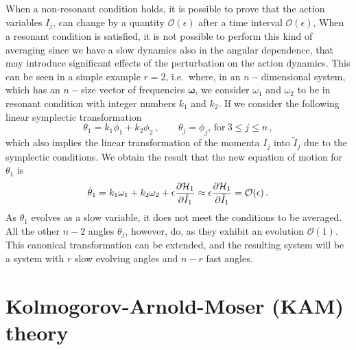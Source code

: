 When a non-resonant condition holds, it is possible to prove that the action variables $I_j$, can change by a quantity $\mathcal{O}(\epsilon)$ after a time interval $\mathcal{O}(\epsilon)$,  
When a resonant condition is satisfied, it is not possible to perform this kind of averaging since we have a slow dynamics also in the angular dependence, that may introduce significant effects of the perturbation on the action dynamics. This can be seen in a simple example $r=2$, i.e.\ where, in an $n-$dimensional system, which has an $n-$size vector of frequencies $\boldsymbol{\omega}$, we consider $\omega_1$ and $\omega_2$ to be in resonant condition with integer numbers $k_1$ and $k_2$. If we consider the following linear symplectic transformation
\begin{equation}
    \theta_1 = k_1 \phi_1 + k_2 \phi_2\,,\qquad \theta_j=\phi_j,\, \text{for}\ 3\leq j \leq n\,,
\end{equation}
which also implies the linear transformation of the momenta $I_j$ into $\tilde I_j$ due to the symplectic conditions. We obtain the result that the new equation of motion for $\theta_1$ is
\begin{equation}
    \dot\theta_1 = k_1\omega_1 + k_2\omega_2 + \epsilon \pdv{\mathcal{H}_1}{\tilde I_1} \approx \epsilon \pdv{\mathcal{H}_1}{\tilde I_1} = \mathcal{O}(\epsilon)\,.
\end{equation}
As $\theta_1$ evolves as a slow variable, it does not meet the conditions to be averaged. All the other $n - 2$ angles $\theta_j$, however, do, as they exhibit an evolution $\mathcal{O}(1)$. This canonical transformation can be extended, and the resulting system will be a system with $r$ slow evolving angles and $n - r$ fast angles.  



\section{Kolmogorov-Arnold-Moser (KAM) theory}\label{sec:1:kam}

